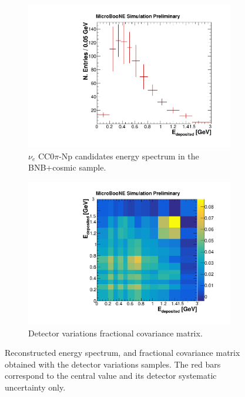 \begin{figure}[htbp]
  \begin{center}
    \begin{subfigure}{0.45\textwidth}
      \includegraphics[width=\linewidth]{figures/reco_det.pdf}
      \caption{$\nu_{e}$ CC0$\pi$-Np candidates energy spectrum in the BNB+cosmic sample.}  \label{fig:reco_det}
    \end{subfigure}
    \begin{subfigure}{0.45\textwidth}
      \includegraphics[width=\linewidth]{figures/frac_det.pdf}
      \caption{Detector variations fractional covariance matrix.}  \label{fig:frac_det}
    \end{subfigure}
    	\caption{Reconstructed energy spectrum, and fractional covariance matrix obtained with the detector variations samples.  The red bars correspond to the central value and its detector systematic uncertainty only.} \label{fig:det_sys}
	\end{center}
\end{figure}


